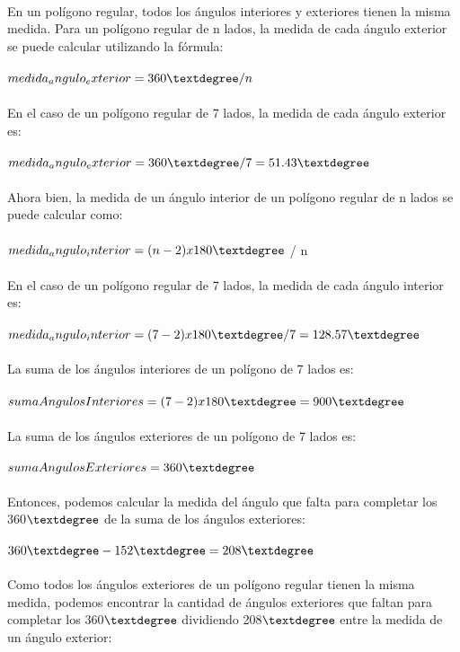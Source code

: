\documentclass{article}
\begin{document}
\\
En un polígono regular, todos los ángulos interiores y exteriores tienen la misma medida. Para un polígono regular de n lados, la medida de cada ángulo exterior se puede calcular utilizando la fórmula:\\
\\
$medida_angulo_exterior = 360\textdegree / n$\\
\\
En el caso de un polígono regular de 7 lados, la medida de cada ángulo exterior es:\\
\\
$medida_angulo_exterior = 360\textdegree / 7 = 51.43\textdegree$\\
\\
Ahora bien, la medida de un ángulo interior de un polígono regular de n lados se puede calcular como:\\
\\
$medida_angulo_interior = (n - 2) x 180\textdegree$ / n\\
\\
En el caso de un polígono regular de 7 lados, la medida de cada ángulo interior es:\\
\\
$medida_angulo_interior = (7 - 2) x 180\textdegree / 7 = 128.57\textdegree$\\
\\
La suma de los ángulos interiores de un polígono de 7 lados es:\\
\\
$sumaAngulosInteriores = (7 - 2) x 180\textdegree = 900\textdegree$\\
\\
La suma de los ángulos exteriores de un polígono de 7 lados es:\\
\\
$sumaAngulosExteriores = 360\textdegree$\\
\\
Entonces, podemos calcular la medida del ángulo que falta para completar los 360$\textdegree$ de la suma de los ángulos exteriores:\\
\\
$360\textdegree - 152\textdegree = 208\textdegree$\\
\\
Como todos los ángulos exteriores de un polígono regular tienen la misma medida, podemos encontrar la cantidad de ángulos exteriores que faltan para completar los 360$\textdegree$ dividiendo 208$\textdegree$ entre la medida de un ángulo exterior:\\
\end{document}
